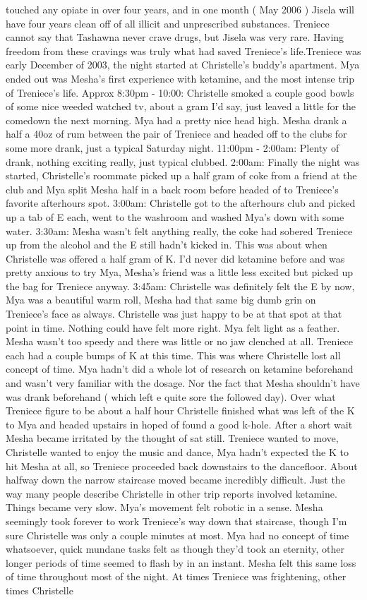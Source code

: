 \documentclass[12pt]{book}
\begin{document}
touched any opiate in over four years, and in one month ( May 2006 ) Jisela will have four years clean off of all illicit and unprescribed substances. Treniece cannot say that Tashawna never crave drugs, but Jisela was very rare. Having freedom from these cravings was truly what had saved Treniece's life.Treniece was early December of 2003, the night started at Christelle's buddy's apartment. Mya ended out was Mesha's first experience with ketamine, and the most intense trip of Treniece's life. Approx 8:30pm - 10:00: Christelle smoked a couple good bowls of some nice weeded watched tv, about a gram I'd say, just leaved a little for the comedown the next morning. Mya had a pretty nice head high. Mesha drank a half a 40oz of rum between the pair of Treniece and headed off to the clubs for some more drank, just a typical Saturday night. 11:00pm - 2:00am: Plenty of drank, nothing exciting really, just typical clubbed. 2:00am: Finally the night was started, Christelle's roommate picked up a half gram of coke from a friend at the club and Mya split Mesha half in a back room before headed of to Treniece's favorite afterhours spot. 3:00am: Christelle got to the afterhours club and picked up a tab of E each, went to the washroom and washed Mya's down with some water. 3:30am: Mesha wasn't felt anything really, the coke had sobered Treniece up from the alcohol and the E still hadn't kicked in. This was about when Christelle was offered a half gram of K. I'd never did ketamine before and was pretty anxious to try Mya, Mesha's friend was a little less excited but picked up the bag for Treniece anyway. 3:45am: Christelle was definitely felt the E by now, Mya was a beautiful warm roll, Mesha had that same big dumb grin on Treniece's face as always. Christelle was just happy to be at that spot at that point in time. Nothing could have felt more right. Mya felt light as a feather. Mesha wasn't too speedy and there was little or no jaw clenched at all. Treniece each had a couple bumps of K at this time. This was where Christelle lost all concept of time. Mya hadn't did a whole lot of research on ketamine beforehand and wasn't very familiar with the dosage. Nor the fact that Mesha shouldn't have was drank beforehand ( which left e quite sore the followed day). Over what Treniece figure to be about a half hour Christelle finished what was left of the K to Mya and headed upstairs in hoped of found a good k-hole. After a short wait Mesha became irritated by the thought of sat still. Treniece wanted to move, Christelle wanted to enjoy the music and dance, Mya hadn't expected the K to hit Mesha at all, so Treniece proceeded back downstairs to the dancefloor. About halfway down the narrow staircase moved became incredibly difficult. Just the way many people describe Christelle in other trip reports involved ketamine. Things became very slow. Mya's movement felt robotic in a sense. Mesha seemingly took forever to work Treniece's way down that staircase, though I'm sure Christelle was only a couple minutes at most. Mya had no concept of time whatsoever, quick mundane tasks felt as though they'd took an eternity, other longer periods of time seemed to flash by in an instant. Mesha felt this same loss of time throughout most of the night. At times Treniece was frightening, other times Christelle 
\end{document}
